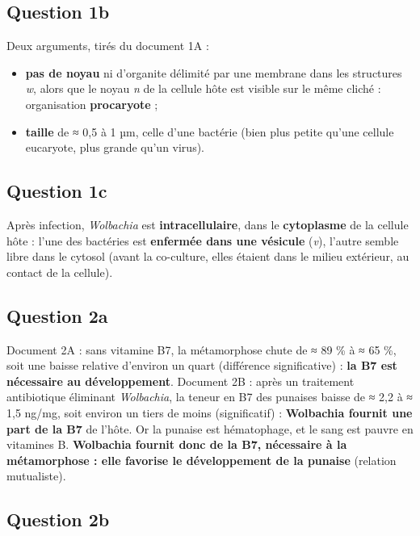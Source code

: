 \documentclass[11pt,a4paper]{article}
\providecommand{\tightlist}{\setlength{\itemsep}{0pt}\setlength{\parskip}{0pt}}
\begin{document}
\hypertarget{question-1b}{%
\subsection{Question 1b}\label{question-1b}}

Deux arguments, tirés du document 1A :

\begin{itemize}
\tightlist
\item
  \textbf{pas de noyau} ni d'organite délimité par une membrane dans les structures \emph{w}, alors que le noyau \emph{n} de la cellule hôte est visible sur le même cliché : organisation \textbf{procaryote} ;
\item
  \textbf{taille} de ≈ 0,5 à 1 µm, celle d'une bactérie (bien plus petite qu'une cellule eucaryote, plus grande qu'un virus).
\end{itemize}

\hypertarget{question-1c}{%
\subsection{Question 1c}\label{question-1c}}

Après infection, \emph{Wolbachia} est \textbf{intracellulaire}, dans le \textbf{cytoplasme} de la cellule hôte : l'une des bactéries est \textbf{enfermée dans une vésicule} (\emph{v}), l'autre semble libre dans le cytosol (avant la co-culture, elles étaient dans le milieu extérieur, au contact de la cellule).

\hypertarget{question-2a}{%
\subsection{Question 2a}\label{question-2a}}

Document 2A : sans vitamine B7, la métamorphose chute de ≈ 89 \% à ≈ 65 \%, soit une baisse relative d'environ un quart (différence significative) : \textbf{la B7 est nécessaire au développement}. Document 2B : après un traitement antibiotique éliminant \emph{Wolbachia}, la teneur en B7 des punaises baisse de ≈ 2,2 à ≈ 1,5 ng/mg, soit environ un tiers de moins (significatif) : \textbf{Wolbachia fournit une part de la B7} de l'hôte. Or la punaise est hématophage, et le sang est pauvre en vitamines B. \textbf{Wolbachia fournit donc de la B7, nécessaire à la métamorphose : elle favorise le développement de la punaise} (relation mutualiste).

\hypertarget{question-2b}{%
\subsection{Question 2b}\label{question-2b}}
\end{document}
